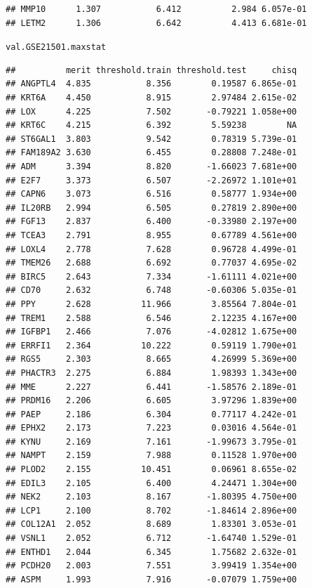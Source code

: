 \documentclass{article}\usepackage[]{graphicx}\usepackage[]{color}
\makeatletter
\newcommand{\hlstd}[1]{\textcolor[rgb]{0.345,0.345,0.345}{#1}}%
\newenvironment{kframe}{%
 \def\at@end@of@kframe{}%
 \ifinner\ifhmode%
  \def\at@end@of@kframe{\end{minipage}}%
  \begin{minipage}{\columnwidth}%
 \fi\fi%
 \def\FrameCommand##1{\hskip\@totalleftmargin \hskip-\fboxsep
 \colorbox{shadecolor}{##1}\hskip-\fboxsep
     \hskip-\linewidth \hskip-\@totalleftmargin \hskip\columnwidth}%
 \MakeFramed {\advance\hsize-\width
   \@totalleftmargin\z@ \linewidth\hsize
   \@setminipage}}%
 {\par\unskip\endMakeFramed%
 \at@end@of@kframe}
\newenvironment{knitrout}{}{} %
\makeatother
\begin{document}
\begin{knitrout}
\begin{kframe}
\begin{verbatim}
## MMP10      1.307           6.412          2.984 6.057e-01
## LETM2      1.306           6.642          4.413 6.681e-01
\end{verbatim}
\begin{alltt}
\hlstd{val.GSE21501.maxstat}
\end{alltt}
\begin{verbatim}
##          merit threshold.train threshold.test     chisq
## ANGPTL4  4.835           8.356        0.19587 6.865e-01
## KRT6A    4.450           8.915        2.97484 2.615e-02
## LOX      4.225           7.502       -0.79221 1.058e+00
## KRT6C    4.215           6.392        5.59238        NA
## ST6GAL1  3.803           9.542        0.78319 5.739e-01
## FAM189A2 3.630           6.455        0.28808 7.248e-01
## ADM      3.394           8.820       -1.66023 7.681e+00
## E2F7     3.373           6.507       -2.26972 1.101e+01
## CAPN6    3.073           6.516        0.58777 1.934e+00
## IL20RB   2.994           6.505        0.27819 2.890e+00
## FGF13    2.837           6.400       -0.33980 2.197e+00
## TCEA3    2.791           8.955        0.67789 4.561e+00
## LOXL4    2.778           7.628        0.96728 4.499e-01
## TMEM26   2.688           6.692        0.77037 4.695e-02
## BIRC5    2.643           7.334       -1.61111 4.021e+00
## CD70     2.632           6.748       -0.60306 5.035e-01
## PPY      2.628          11.966        3.85564 7.804e-01
## TREM1    2.588           6.546        2.12235 4.167e+00
## IGFBP1   2.466           7.076       -4.02812 1.675e+00
## ERRFI1   2.364          10.222        0.59119 1.790e+01
## RGS5     2.303           8.665        4.26999 5.369e+00
## PHACTR3  2.275           6.884        1.98393 1.343e+00
## MME      2.227           6.441       -1.58576 2.189e-01
## PRDM16   2.206           6.605        3.97296 1.839e+00
## PAEP     2.186           6.304        0.77117 4.242e-01
## EPHX2    2.173           7.223        0.03016 4.564e-01
## KYNU     2.169           7.161       -1.99673 3.795e-01
## NAMPT    2.159           7.988        0.11528 1.970e+00
## PLOD2    2.155          10.451        0.06961 8.655e-02
## EDIL3    2.105           6.400        4.24471 1.304e+00
## NEK2     2.103           8.167       -1.80395 4.750e+00
## LCP1     2.100           8.702       -1.84614 2.896e+00
## COL12A1  2.052           8.689        1.83301 3.053e-01
## VSNL1    2.052           6.712       -1.64740 1.529e-01
## ENTHD1   2.044           6.345        1.75682 2.632e-01
## PCDH20   2.003           7.551        3.99419 1.354e+00
## ASPM     1.993           7.916       -0.07079 1.759e+00

\end{verbatim}
\end{kframe}
\end{knitrout}
\end{document}
